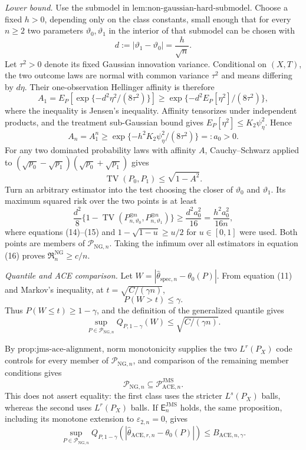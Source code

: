 \emph{Lower bound.}
Use the submodel in \(\text{lem:non-gaussian-hard-submodel}\).  Choose a fixed \(h>0\), depending only on the class constants, small enough that for every \(n\ge2\) two parameters \(\vartheta_0,\vartheta_1\) in the interior of that submodel can be chosen with
\[
 d:=|\vartheta_1-\vartheta_0|=\frac h{\sqrt n}.
\]
Let \(\tau^2>0\) denote its fixed Gaussian innovation variance.  Conditional on \((X,T)\), the two outcome laws are normal with common variance \(\tau^2\) and means differing by \(d\eta\).  Their one-observation Hellinger affinity is therefore
\[
 A_1=E_P\!\left[\exp\{-d^2\eta^2/(8\tau^2)\}\right]
 \ge \exp\{-d^2E_P[\eta^2]/(8\tau^2)\},                \tag{13}
\]
where the inequality is Jensen's inequality.  Affinity tensorizes under independent products, and the treatment sub-Gaussian bound gives \(E_P[\eta^2]\le K_2\psi_{\eta}^2\).  Hence
\[
 A_n=A_1^n
 \ge \exp\{-h^2K_2\psi_{\eta}^2/(8\tau^2)\}
 =:a_0>0.                                               \tag{14}
\]
For any two dominated probability laws with affinity \(A\), Cauchy--Schwarz applied to \((\sqrt{p_0}-\sqrt{p_1})(\sqrt{p_0}+\sqrt{p_1})\) gives
\[
 \operatorname{TV}(P_0,P_1)\le\sqrt{1-A^2}.            \tag{15}
\]
Turn an arbitrary estimator into the test choosing the closer of \(\vartheta_0\) and \(\vartheta_1\).  Its maximum squared risk over the two points is at least
\[
 \frac{d^2}{8}
 \{1-\operatorname{TV}(P_{n,\vartheta_0}^{\otimes n},
                       P_{n,\vartheta_1}^{\otimes n})\}
 \ge \frac{d^2a_0^2}{16}
 =\frac{h^2a_0^2}{16n},                                 \tag{16}
\]
where equations (14)--(15) and \(1-\sqrt{1-u}\ge u/2\) for \(u\in[0,1]\) were used.  Both points are members of \(\mathcal P_{\mathrm{NG},n}\).  Taking the infimum over all estimators in equation (16) proves \(\mathfrak R_n^{\mathrm{NG}}\ge c/n\).

\emph{Quantile and ACE comparison.}
Let \(W=|\widehat\theta_{\mathrm{spec},n}-\theta_0(P)|\).  From equation (11) and Markov's inequality, at \(t=\sqrt{C/(\gamma n)}\),
\[
 P(W>t)\le\gamma.
\]
Thus \(P(W\le t)\ge1-\gamma\), and the definition of the generalized quantile gives
\[
 \sup_{P\in\mathcal P_{\mathrm{NG},n}}
 Q_{P,1-\gamma}(W)\le\sqrt{C/(\gamma n)}.               \tag{17}
\]

By \(\text{prop:jms-ace-alignment}\), norm monotonicity supplies the two \(L^r(P_X)\) code controls for every member of \(\mathcal P_{\mathrm{NG},n}\), and comparison of the remaining member conditions gives
\[
 \mathcal P_{\mathrm{NG},n}
 \subseteq\mathcal P_{\mathrm{ACE},n}^{\mathrm{JMS}}.   \tag{18}
\]
This does not assert equality: the first class uses the stricter \(L^s(P_X)\) balls, whereas the second uses \(L^r(P_X)\) balls.  If \(\mathsf E_n^{\mathrm{JMS}}\) holds, the same proposition, including its monotone extension to \(\varepsilon_{2,n}=0\), gives
\[
 \sup_{P\in\mathcal P_{\mathrm{NG},n}}
 Q_{P,1-\gamma}
 \!\left(|\widehat\theta_{\mathrm{ACE},r,n}-\theta_0(P)|\right)
 \le B_{\mathrm{ACE},n,\gamma}.                         \tag{19}
\]

